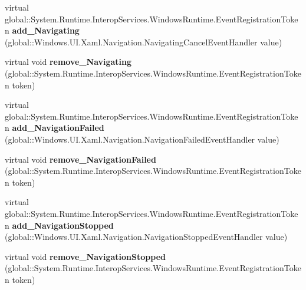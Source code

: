 \begin{DoxyCompactItemize}
\item 
\mbox{\label{class_windows_1_1_u_i_1_1_xaml_1_1_controls_1_1_frame_afe49379e4ea3f7d217517f9ee7ba2bf9}} 
virtual global\+::\+System.\+Runtime.\+Interop\+Services.\+Windows\+Runtime.\+Event\+Registration\+Token {\bfseries add\+\_\+\+Navigating} (global\+::\+Windows.\+U\+I.\+Xaml.\+Navigation.\+Navigating\+Cancel\+Event\+Handler value)
\item 
\mbox{\label{class_windows_1_1_u_i_1_1_xaml_1_1_controls_1_1_frame_acc34f8b3bc84d17cad43aca5bcf5e0d4}} 
virtual void {\bfseries remove\+\_\+\+Navigating} (global\+::\+System.\+Runtime.\+Interop\+Services.\+Windows\+Runtime.\+Event\+Registration\+Token token)
\item 
\mbox{\label{class_windows_1_1_u_i_1_1_xaml_1_1_controls_1_1_frame_aa26741405bfc110f4b1b1905879092fd}} 
virtual global\+::\+System.\+Runtime.\+Interop\+Services.\+Windows\+Runtime.\+Event\+Registration\+Token {\bfseries add\+\_\+\+Navigation\+Failed} (global\+::\+Windows.\+U\+I.\+Xaml.\+Navigation.\+Navigation\+Failed\+Event\+Handler value)
\item 
\mbox{\label{class_windows_1_1_u_i_1_1_xaml_1_1_controls_1_1_frame_a5d519629c46865af9d6caf0f44a517fd}} 
virtual void {\bfseries remove\+\_\+\+Navigation\+Failed} (global\+::\+System.\+Runtime.\+Interop\+Services.\+Windows\+Runtime.\+Event\+Registration\+Token token)
\item 
\mbox{\label{class_windows_1_1_u_i_1_1_xaml_1_1_controls_1_1_frame_a6bf2da59d0a90e490aecaa3f355783ac}} 
virtual global\+::\+System.\+Runtime.\+Interop\+Services.\+Windows\+Runtime.\+Event\+Registration\+Token {\bfseries add\+\_\+\+Navigation\+Stopped} (global\+::\+Windows.\+U\+I.\+Xaml.\+Navigation.\+Navigation\+Stopped\+Event\+Handler value)
\item 
\mbox{\label{class_windows_1_1_u_i_1_1_xaml_1_1_controls_1_1_frame_a18e9954aafd2a9225401b40871f4f115}} 
virtual void {\bfseries remove\+\_\+\+Navigation\+Stopped} (global\+::\+System.\+Runtime.\+Interop\+Services.\+Windows\+Runtime.\+Event\+Registration\+Token token)

\end{DoxyCompactItemize}

